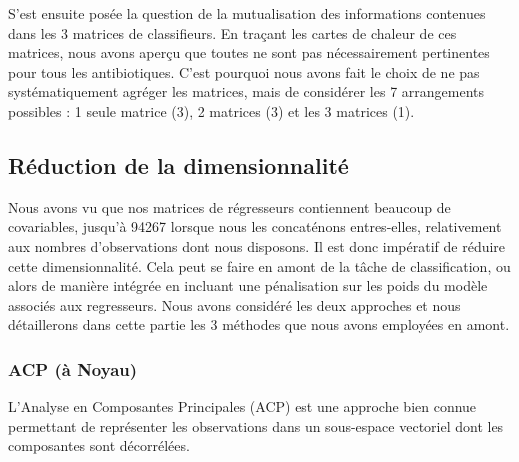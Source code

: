 \documentclass[11pt]{article}
\begin{document}
  S'est ensuite posée la question de la mutualisation des informations contenues dans les 3 matrices de classifieurs.
  En traçant les cartes de chaleur de ces matrices, nous avons aperçu que toutes ne sont pas nécessairement pertinentes pour tous les antibiotiques.
  C'est pourquoi nous avons fait le choix de ne pas systématiquement agréger les matrices, mais de considérer les 7 arrangements possibles : 1 seule matrice (3), 2 matrices (3) et les 3 matrices (1).

\hypertarget{reduction-dimension}{%
\subsection{Réduction de la dimensionnalité}\label{reduction-dimension}}

  Nous avons vu que nos matrices de régresseurs contiennent beaucoup de covariables, jusqu'à 94267 lorsque nous les concaténons entres-elles, relativement aux nombres d'observations dont nous disposons.
  Il est donc impératif de réduire cette dimensionnalité.
  Cela peut se faire en amont de la tâche de classification, ou alors de manière intégrée en incluant une pénalisation sur les poids du modèle associés aux regresseurs.
  Nous avons considéré les deux approches et nous détaillerons dans cette partie les 3 méthodes que nous avons employées en amont.

\hypertarget{acp-noyau}{%
\subsubsection{ACP (à Noyau)}\label{acp-noyau}}

  L'Analyse en Composantes Principales (ACP) est une approche bien connue permettant de représenter les observations dans un sous-espace vectoriel dont les composantes sont décorrélées.
\end{document}
